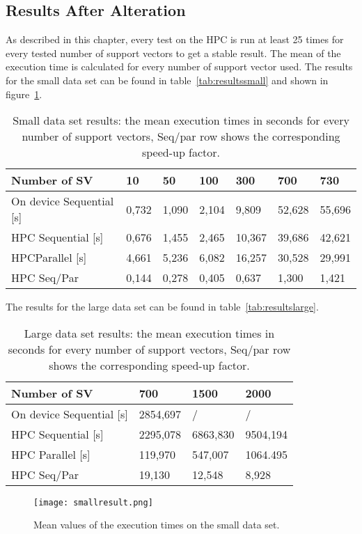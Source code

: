 \subsection{Results After Alteration}
As described in this chapter, every test on the HPC is run at least 25 times for every tested number of support vectors to get a stable result.
The mean of the execution time is calculated for every number of support vector used.
The results for the small data set can be found in table~\vref{tab:resultssmall} and shown in figure~\ref{fig:smallresult}.
\begin{table}[]
	\centering
	\begin{tabular}{l|llllll}
		Number of SV 		& 10          	& 50         & 100         & 300        & 700       & 730    \\ \hline
		On device Sequential [s]   	& 0,732  	   	& 1,090  	 & 2,104 	   & 9,809 	& 52,628 	& 55,696 \\
		HPC Sequential [s]   	& 0,676  	   	& 1,455  	 & 2,465 	   & 10,367 	& 39,686 	& 42,621 \\
		HPCParallel   [s]  	& 4,661  	   	& 5,236  	 & 6,082  	   & 16,257 	& 30,528  	& 29,991 \\ \hline
		HPC Seq/Par      		& 0,144  	   	& 0,278	     & 0,405	   & 0,637 		& 1,300 	& 1,421
	\end{tabular}
	\caption{Small data set results: the mean execution times in seconds for every number of support vectors, Seq/par row shows the corresponding speed-up factor.}
	\label{tab:resultssmall}
\end{table}
The results for the large data set can be found in table~\vref{tab:resultslarge}.
\begin{table}[]
	\centering
	\begin{tabular}{l|lll}
		Number of SV       & 700      & 1500     & 2000 		\\ \hline
		On device Sequential [s] & 2854,697 & / &  /    \\
		HPC Sequential {[}s{]} & 2295,078 & 6863,830 &  9504,194    \\
		HPC Parallel {[}s{]}   & 119,970  & 547,007  &  1064.495	 \\ \hline
		HPC Seq/Par            & 19,130   & 12,548   &  8,928   			
	\end{tabular}
\caption{Large data set results: the mean execution times in seconds for every number of support vectors, Seq/par row shows the corresponding speed-up factor.}
\label{tab:resultslarge}
\end{table}
\begin{figure}
	\centering
	\texttt{[image: smallresult.png]}
	\caption{Mean values of the execution times on the small data set.}
	\label{fig:smallresult}
\end{figure}
